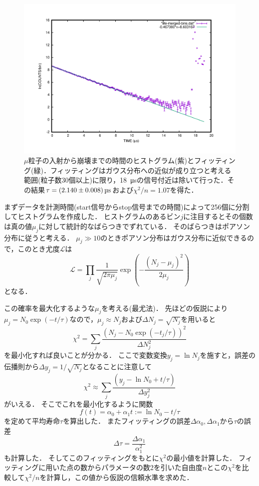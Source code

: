 \documentclass[a4paper,11pt]{jsarticle}
\begin{document}
\begin{figure}[htbp]
  \centering
  \includegraphics[width=13cm]{life.pdf}
  \caption{$\mu$粒子の入射から崩壊までの時間のヒストグラム(紫)とフィッティング(緑)．フィッティングはガウス分布への近似が成り立つと考える範囲(粒子数30個以上)に限り，\SI{18}{\us}の信号付近は除いて行った．その結果$\tau = \SI[separate-uncertainty]{2.140\pm 0.008}{\us}$および$\chi^2/n=1.07$を得た．}
  \label{fig:life}
\end{figure}

まずデータを計測時間(start信号からstop信号までの時間)によって256個に分割してヒストグラムを作成した．
ヒストグラムのあるビン$j$に注目するとその個数は真の値$\mu_j$に対して統計的なばらつきでずれている．
そのばらつきはポアソン分布に従うと考える．
$\mu_j \gg 10$のときポアソン分布はガウス分布に近似できるので，このとき尤度$\mathcal{L}$は
\begin{equation}
  \mathcal{L} = \prod_j \frac{1}{\sqrt{2\pi \mu_j}}\exp\left( - \frac{(N_j-\mu_j)^2}{2\mu_j}\right)
\end{equation}
となる．

この確率を最大化するような$\mu_j$を考える(最尤法)．
先ほどの仮説により$\mu_j=N_0\exp(-t/\tau)$なので，$\mu_j \approx N_j$および$\Delta N_j = \sqrt{N_j}$を用いると
\begin{equation}
  \chi^2 = \sum_j \frac{(N_j - N_0\exp(-t_j/\tau))^2}{\Delta N_j^2} 
\end{equation}
を最小化すれば良いことが分かる．
ここで変数変換$y_j = \ln{N_j}$を施すと，誤差の伝播則から$\Delta y_j = 1/\sqrt{N_j}$となることに注意して
\begin{equation}
  \chi^2 \approx \sum_j \frac{(y_j - \ln{N_0} + t/\tau)}{\Delta y_j^2}
\end{equation}
がいえる．
そこでこれを最小化するように関数
\begin{equation}
  f(t) = \alpha_0 + \alpha_1 t := \ln{N_0} - t/\tau
\end{equation}
を定めて平均寿命$\tau$を算出した．
またフィッティングの誤差$\Delta\alpha_0, \Delta\alpha_1$から$\tau$の誤差
\begin{equation}
  \Delta\tau = \frac{\Delta \alpha_1}{\alpha_1^2}
\end{equation}
も計算した．
そしてこのフィッティングをもとに$\chi^2$の最小値を計算した．
フィッティングに用いた点の数からパラメータの数2を引いた自由度$n$とこの$\chi^2$を比較して$\chi^2/n$を計算し，この値から仮説の信頼水準を求めた．
\end{document}
